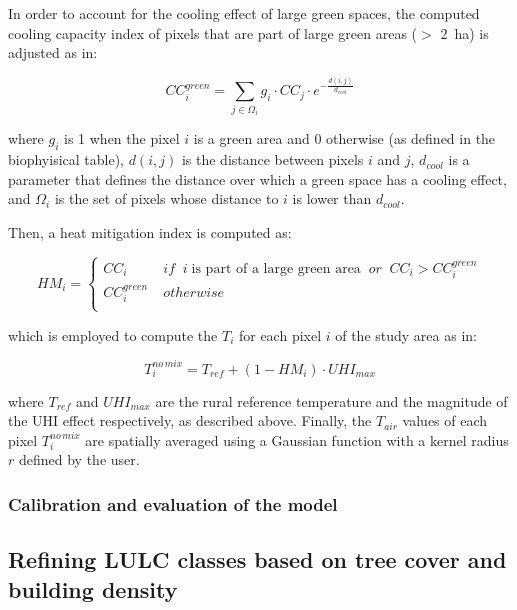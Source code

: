 \documentclass[10pt,letterpaper]{article}
\begin{document}
In order to account for the cooling effect of large green spaces, the computed cooling capacity index of pixels that are part of large green areas ($>$ 2~ha) is adjusted as in:

\begin{equation}
  \label{eq:cooling-capacity-green}
  CC_i^{green} = \sum_{j \in \Omega_i} g_i \cdot CC_j \cdot e^{-\frac{d(i, j)}{d_{cool}}}
\end{equation}

where $g_i$ is 1 when the pixel $i$ is a green area and 0 otherwise (as defined in the biophyisical table), $d(i, j)$ is the distance between pixels $i$ and $j$, $d_{cool}$ is a parameter that defines the distance over which a green space has a cooling effect, and $\Omega_i$ is the set of pixels whose distance to $i$ is lower than $d_{cool}$.

Then, a heat mitigation index is computed as:

\begin{equation}
  \label{eq:heat-mitigation index}
  HM_i = \begin{cases}
    CC_i & \; if \;\; i \; \textrm{is part of a large green area} \;\; or \;\; CC_i > CC_i^{green} \\[.5em]
    CC_i^{green} & \; otherwise \\
    \end{cases}
\end{equation}

which is employed to compute the $T_i$ for each pixel $i$ of the study area as in:

\begin{equation}
  \label{eq:tair-nomix}
  T_i^{no \, mix} = T_{ref} + (1 - HM_i) \cdot UHI_{max}
\end{equation}

where $T_{ref}$ and $UHI_{max}$ are the rural reference temperature and the magnitude of the UHI effect respectively, as described above.
Finally, the $T_{air}$ values of each pixel $T_i^{no \, mix}$ are spatially averaged using a Gaussian function with a kernel radius $r$ defined by the user.


\subsubsection*{Calibration and evaluation of the model}




\subsection*{Refining LULC classes based on tree cover and building density}
\label{sec:refin-lulc-class}
\end{document}
